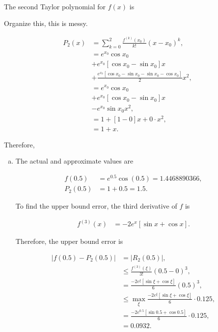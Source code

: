 \documentclass[a4paper, 10pt]{article}
\newenvironment{answer}[1][Answer]{\begin{trivlist}
\item[\hskip\labelsep{\textit{#1.}}]}{\end{trivlist}}
\begin{document}
\begin{answer}
	The second Taylor polynomial for $f(x)$ is

	{\color{blue} Organize this, this is messy.}

	\begin{align*}
		P_2(x) &= \sum_{k=0}^2 \frac{f^{(k)}(x_0)}{k!} (x - x_0)^k,\\
			   &= e^{x_0} \cos{x_0}\\
			   &+ e^{x_0} \left[ \cos{x_0} - \sin{x_0} \right] x\\
			   &+ \frac{e^{x_0} \left[\cos{x_0} - \sin{x_0} - \sin{x_0} - \cos{x_0} \right]}{2} x^2,\\
			   &= e^{x_0} \cos{x_0}\\
			   &+ e^{x_0} \left[ \cos{x_0} - \sin{x_0} \right] x\\
			   &- e^{x_0} \sin{x_0} x^2,\\
			   &= 1 + \left[ 1 - 0  \right] x + 0 \cdot x^2,\\
			   &= 1 + x.
	\end{align*}

	Therefore, 

	\begin{enumerate}[(a)]
		\item The actual and approximate values are 

			\begin{align*}
				f(0.5) &= e^{0.5} \cos{(0.5)} = 1.4468890366,\\
				P_2(0.5) &= 1 + 0.5 = 1.5.
			\end{align*}

			To find the upper bound error, the third derivative of $f$ is

			\begin{align*}
				f^{(3)}(x) &= -2 e^{x} \left[ \sin{x} + \cos{x} \right]. 
			\end{align*}

			Therefore, the upper bound error is

			\begin{align*}
				| f(0.5) - P_2(0.5) | &= | R_2 (0.5) |,\\
				&\leq \frac{f^{(3)}(\xi)}{3!} (0.5 - 0)^{3},\\
				&= \frac{-2 e^\xi \left[ \sin\xi + \cos\xi \right]}{6} (0.5)^3,\\
				&\leq \max_\xi \frac{-2e^\xi \left[ \sin\xi + \cos\xi \right]}{6} \cdot 0.125,\\
				&= \frac{-2 e^{0.5} \left[ \sin{0.5} + \cos{0.5} \right]}{6} \cdot 0.125,\\ 
				&= 0.0932.
			\end{align*}


\end{enumerate}
\end{answer}
\end{document}
